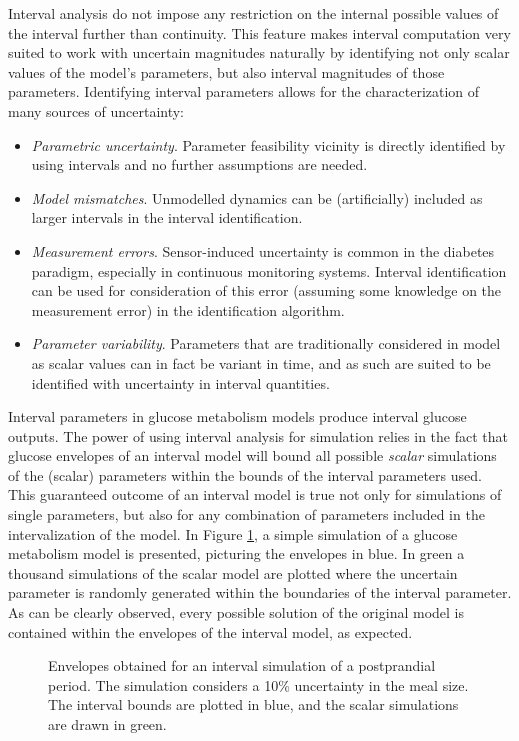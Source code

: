 Interval analysis do not impose any restriction on the internal possible values of the interval further than continuity. This feature makes interval computation very suited to work with uncertain magnitudes naturally by identifying not only scalar values of the model's parameters, but also interval magnitudes of those parameters. Identifying interval parameters allows for the characterization of many sources of uncertainty:

\begin{itemize}
	\item \textit{Parametric uncertainty}. Parameter feasibility vicinity is directly identified by using intervals and no further assumptions are needed.
	\item \textit{Model mismatches}. Unmodelled dynamics can be (artificially) included as larger intervals in the interval identification.
	\item \textit{Measurement errors}. Sensor-induced uncertainty is common in the diabetes paradigm, especially in continuous monitoring systems. Interval identification can be used for consideration of this error (assuming some knowledge on the measurement error) in the identification algorithm.
	\item \textit{Parameter variability}. Parameters that are traditionally considered in model as scalar values can in fact be variant in time, and as such are suited to be identified with uncertainty in interval quantities.
\end{itemize}

Interval parameters in glucose metabolism models produce interval glucose outputs. The power of using interval analysis for simulation relies in the fact that glucose envelopes of an interval model will bound all possible \textit{scalar} simulations of the (scalar) parameters within the bounds of the interval parameters used. This guaranteed outcome of an interval model is true not only for simulations of single parameters, but also for any combination of parameters included in the intervalization of the model. In Figure \ref{fig:intervalenvelope}, a simple simulation of a glucose metabolism model is presented, picturing the envelopes in blue. In green a thousand simulations of the scalar model are plotted where the uncertain parameter is randomly generated within the boundaries of the interval parameter. As can be clearly observed, every possible solution of the original model is contained within the envelopes of the interval model, as expected.

\begin{figure}[hbtp]
\centering
{}\caption{Envelopes obtained for an interval simulation of a postprandial period. The simulation considers a 10\% uncertainty in the meal size. The interval bounds are plotted in blue, and the scalar simulations are drawn in green.}
\label{fig:intervalenvelope}
\end{figure}

